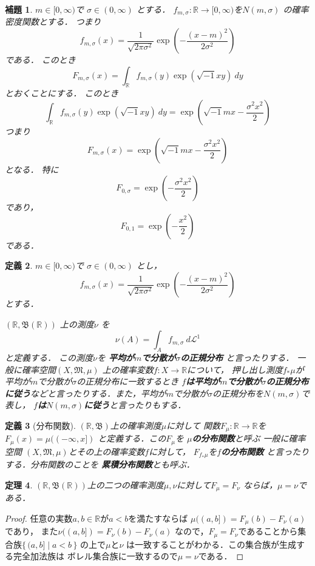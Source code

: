 \documentclass[leqno, 12pt]{jsarticle}
\newtheorem{thm}{定理}
\newtheorem{lem}[thm]{補題}
\newtheorem{df}[thm]{定義}
\newcommand{\rr}{\mathbb{R}}
\begin{document}
\begin{lem}


$m\in [0, \infty)$で
$\sigma\in (0, \infty)$
とする．
$f_{m, \sigma}: \rr\to [0, \infty)$を$N(m, \sigma)$
の確率密度関数とする．
つまり
\[
f_{m, \sigma}(x)=
\frac{1}{\sqrt{2\pi\sigma^2}}
\exp\left(-\frac{(x-m)^2}{2\sigma^2}\right)
\]
である．
このとき
\[
F_{m, \sigma}(x)=\int_{\rr}f_{m, \sigma}(y)\exp(\sqrt{-1}xy)\ dy
\]
とおくことにする．
このとき
\[
\int_{\rr}f_{m, \sigma}(y)\exp(\sqrt{-1}xy)\ dy
=
\exp\left(\sqrt{-1}mx-\frac{\sigma^2x^2}{2}\right)
\]
つまり
\[
F_{m, \sigma}(x)=\exp\left(\sqrt{-1}mx-\frac{\sigma^2x^2}{2}\right)
\]
となる．
特に
\[
F_{0, \sigma}=\exp\left(-\frac{\sigma^2x^2}{2}\right)
\]
であり，
\[
F_{0, 1}=\exp\left(-\frac{x^2}{2}\right)
\]
である．

\end{lem}



\begin{df}

$m\in [0, \infty)$で
$\sigma\in (0, \infty)$
とし，
\[
f_{m, \sigma}(x)=
\frac{1}{\sqrt{2\pi\sigma^2}}
\exp\left(-\frac{(x-m)^2}{2\sigma^2}\right)
\]
とする．

$(\rr, \mathfrak{B}(\rr))$
上の測度$\nu$
を
\[
\nu(A)=\int_{A}f_{m, \sigma}\ d\mathcal{L}^{1}
\]
と定義する．
この測度$\nu$を
\textbf{平均が$m$で分散が$\sigma$の正規分布}
と言ったりする．
一般に確率空間$(X, \mathfrak{M}, \mu)$
上の確率変数$f:X\to \rr$について，
押し出し測度$f_{*}\mu$が平均が$m$で分散が$\sigma$の正規分布に一致するとき
\textbf{$f$は平均が$m$で分散が$\sigma$の正規分布に従う}などと言ったりする．また，平均が$m$で分散が$\sigma$の正規分布を$N(m, \sigma)$で表し，
\textbf{
$f$は$N(m, \sigma)$に従う}と言ったりもする．
\end{df}


\begin{df}[分布関数]
$(\rr, \mathfrak{B})$上の確率測度$\mu$に対して
関数$F_{\mu}: \rr\to \rr$を
$F_{\mu}(x)=\mu((-\infty, x])$
と定義する．この$F_{\mu}$を
\textbf{$\mu$の分布関数}と呼ぶ
一般に確率空間
$(X, \mathfrak{M}, \mu)$とその上の確率変数$f$に対して，
$F_{f_{*}\mu}$を\textbf{$f$の分布関数}
と言ったりする．分布関数のことを
\textbf{累積分布関数}とも呼ぶ．
\end{df}



\begin{thm}\label{thm:ls}
$(\rr, \mathfrak{B}(\rr))$上の二つの確率測度$\mu, \nu$に対して$F_{\mu}=F_{\nu}$
ならば，$\mu=\nu$である．
\end{thm}
\begin{proof}
任意の実数$a, b\in \rr$が$a<b$を満たすならば
$\mu((a, b])=F_{\mu}(b)-F_{\nu}(a)$であり，
また$\nu((a, b])=F_{\nu}(b)-F_{\nu}(a)$
なので，$F_{\mu}=F_{\nu}$であることから集合族$\{\, (a, b]\mid a<b\, \}$
の上で$\mu$と$\nu$
は一致することがわかる．この集合族が生成する完全加法族は
ボレル集合族に一致するので$\mu=\nu$である．
\end{proof}
\end{document}
